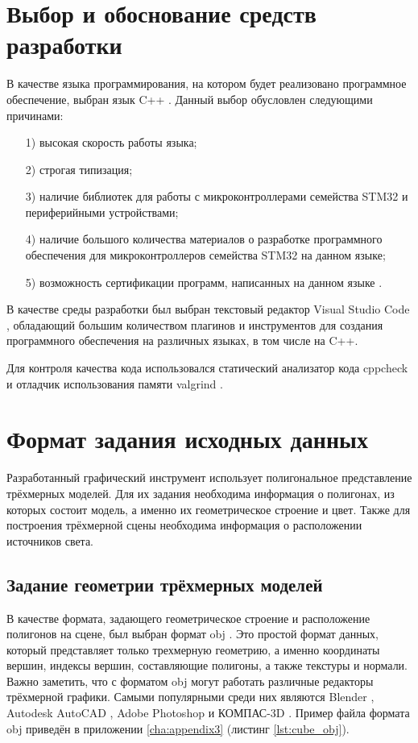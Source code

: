 \section{Выбор и обоснование средств разработки}
В качестве языка программирования, на котором будет реализовано программное обеспечение, выбран язык C++ \cite{cpp}.
Данный выбор обусловлен следующими причинами:
\begin{enumerate}
	\item[1)] высокая скорость работы языка;
	\item[2)] строгая типизация;
	\item[3)] наличие библиотек для работы с микроконтроллерами семейства STM32 и периферийными устройствами;
	\item[4)] наличие большого количества материалов о разработке программного обеспечения для микроконтроллеров семейства STM32 на данном языке;
	\item[5)] возможность сертификации программ, написанных на данном языке \cite{fstec}.
\end{enumerate}

В качестве среды разработки был выбран текстовый редактор Visual Studio Code \cite{vscode}, обладающий большим количеством плагинов 
и инструментов для создания программного обеспечения на различных языках, в том числе на C++.

Для контроля качества кода использовался статический анализатор кода cppcheck \cite{cppcheck} и отладчик использования памяти 
valgrind \cite{valgrind}.



\section{Формат задания исходных данных}
Разработанный графический инструмент использует полигональное представление трёхмерных моделей. Для их задания необходима информация 
о полигонах, из которых состоит модель, а именно их геометрическое строение и цвет. Также для построения трёхмерной сцены необходима 
информация о расположении источников света.

\subsection{Задание геометрии трёхмерных моделей}
В качестве формата, задающего геометрическое строение и расположение полигонов на сцене, был выбран формат obj \cite{obj}. Это  простой 
формат данных, который представляет только трехмерную геометрию, а именно координаты вершин, индексы вершин, 
составляющие полигоны, а также текстуры и нормали. Важно заметить, что с форматом obj могут работать различные редакторы 
трёхмерной графики. Самыми популярными среди них являются Blender \cite{blender}, Autodesk AutoCAD \cite{autocad}, 
Adobe Photoshop \cite{photoshop} и КОМПАС-3D \cite{compass}. Пример файла формата obj приведён в приложении \ref{cha:appendix3} 
(листинг \ref{lst:cube_obj}).

